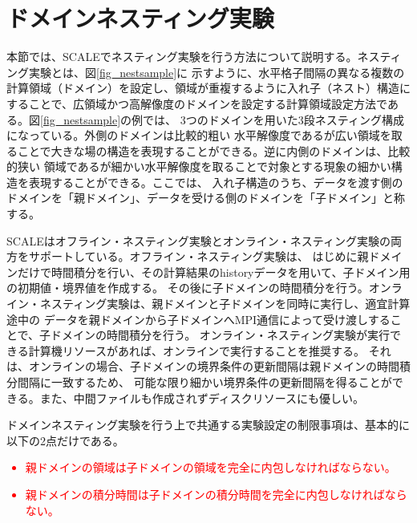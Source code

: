
\section{ドメインネスティング実験} \label{sec:nest_exp}

本節では、SCALEでネスティング実験を行う方法について説明する。ネスティング実験とは、図\ref{fig_nestsample}に
示すように、水平格子間隔の異なる複数の計算領域（ドメイン）を設定し、領域が重複するように入れ子（ネスト）構造に
することで、広領域かつ高解像度のドメインを設定する計算領域設定方法である。図\ref{fig_nestsample}の例では、
3つのドメインを用いた3段ネスティング構成になっている。外側のドメインは比較的粗い
水平解像度であるが広い領域を取ることで大きな場の構造を表現することができる。逆に内側のドメインは、比較的狭い
領域であるが細かい水平解像度を取ることで対象とする現象の細かい構造を表現することができる。ここでは、
入れ子構造のうち、データを渡す側のドメインを「親ドメイン」、データを受ける側のドメインを「子ドメイン」と称する。

SCALEはオフライン・ネスティング実験とオンライン・ネスティング実験の両方をサポートしている。オフライン・ネスティング実験は、
はじめに親ドメインだけで時間積分を行い、その計算結果のhistoryデータを用いて、子ドメイン用の初期値・境界値を作成する。
その後に子ドメインの時間積分を行う。オンライン・ネスティング実験は、親ドメインと子ドメインを同時に実行し、適宜計算途中の
データを親ドメインから子ドメインへMPI通信によって受け渡しすることで、子ドメインの時間積分を行う。
オンライン・ネスティング実験が実行できる計算機リソースがあれば、オンラインで実行することを推奨する。
それは、オンラインの場合、子ドメインの境界条件の更新間隔は親ドメインの時間積分間隔に一致するため、
可能な限り細かい境界条件の更新間隔を得ることができる。また、中間ファイルも作成されずディスクリソースにも優しい。

ドメインネスティング実験を行う上で共通する実験設定の制限事項は、基本的に以下の2点だけである。
\textcolor{red}{
\begin{itemize}
 \item 親ドメインの領域は子ドメインの領域を完全に内包しなければならない。
 \item 親ドメインの積分時間は子ドメインの積分時間を完全に内包しなければならない。
\end{itemize}
}

